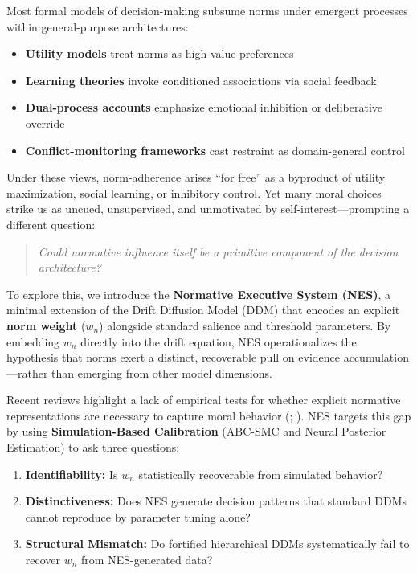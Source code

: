 \documentclass[
  11pt,
]{article}
\providecommand{\tightlist}{%
  \setlength{\itemsep}{0pt}\setlength{\parskip}{0pt}}
\begin{document}
Most formal models of decision-making subsume norms under emergent
processes within general-purpose architectures:

\begin{itemize}
\tightlist
\item
  \textbf{Utility models} treat norms as high-value preferences\\
\item
  \textbf{Learning theories} invoke conditioned associations via social
  feedback\\
\item
  \textbf{Dual-process accounts} emphasize emotional inhibition or
  deliberative override\\
\item
  \textbf{Conflict-monitoring frameworks} cast restraint as
  domain-general control
\end{itemize}

Under these views, norm-adherence arises ``for free'' as a byproduct of
utility maximization, social learning, or inhibitory control. Yet many
moral choices strike us as uncued, unsupervised, and unmotivated by
self-interest---prompting a different question:

\begin{quote}
\emph{Could normative influence itself be a primitive component of the
decision architecture?}
\end{quote}

To explore this, we introduce the \textbf{Normative Executive System
(NES)}, a minimal extension of the Drift Diffusion Model (DDM) that
encodes an explicit \textbf{norm weight} (\(w_n\)) alongside standard
salience and threshold parameters. By embedding \(w_n\) directly into
the drift equation, NES operationalizes the hypothesis that norms exert
a distinct, recoverable pull on evidence accumulation---rather than
emerging from other model dimensions.

Recent reviews highlight a lack of empirical tests for whether explicit
normative representations are necessary to capture moral behavior
(; ). NES
targets this gap by using \textbf{Simulation-Based Calibration} (ABC-SMC
and Neural Posterior Estimation) to ask three questions:

\begin{enumerate}
\def\labelenumi{\arabic{enumi}.}
\tightlist
\item
  \textbf{Identifiability:} Is \(w_n\) statistically recoverable from
  simulated behavior?\\
\item
  \textbf{Distinctiveness:} Does NES generate decision patterns that
  standard DDMs cannot reproduce by parameter tuning alone?\\
\item
  \textbf{Structural Mismatch:} Do fortified hierarchical DDMs
  systematically fail to recover \(w_n\) from NES-generated data?
\end{enumerate}
\end{document}
